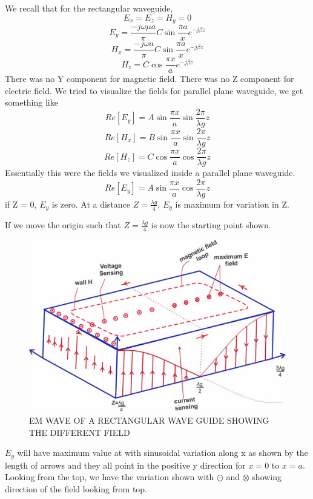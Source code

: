 We recall that for the rectangular waveguide,
\begin{equation}
E_{x} = E_{z} = H_{y} = 0
\end{equation}	
\begin{equation}
E_{y} = \dfrac{-j\omega\mu a }{\pi} C\sin \dfrac{\pi a}{x} e ^{-j\beta z}
\end{equation}
\begin{equation}
H_{x} = \dfrac{-j\omega a}{\pi} C \sin\dfrac{\pi a}{x}
	e^{-j\beta z} 
\end{equation}
\begin{equation}
H_{z} = C\cos \dfrac{\pi x}{a} e^{-j\beta z}
\end{equation}
There was no Y component for magnetic field. There was no Z component for electric field. We tried to visualize the fields for parallel plane waveguide, we get something like 
\begin{equation}
Re[E_{y}] = A\sin\dfrac{\pi x}{a} \sin\dfrac{2\pi}{\lambda g}z
\end{equation}	
\begin{equation}
Re[H_{x}] = B\sin\dfrac{\pi x}{a} \sin\dfrac{2\pi}{\lambda g}z
\end{equation}
\begin{equation}
Re[H_{z}] = C\cos\dfrac{\pi x}{a} \cos\dfrac{2\pi}{\lambda g}z
\end{equation}
Essentially this were the fields we visualized inside a
parallel plane waveguide.
\begin{equation}
Re[E_{y}] = A\sin\dfrac{\pi x}{a} \cos\dfrac{2\pi}{\lambda g}z
\end{equation}
if Z = 0, $E_{y}$ is zero. At a distance $ Z = \frac{\lambda g}{4}$, $E_{y}$ is maximum for variation in Z.

If we move the origin such that $Z = \frac{\lambda g}{4}$ is now the starting point shown.
\begin{figure}[h]
\centering
\includegraphics[width=1\linewidth]{./graphics/lecture-image-2.jpg}
\caption{EM WAVE OF A RECTANGULAR WAVE GUIDE SHOWING THE DIFFERENT FIELD}
\end{figure}
$E_{y}$ will have maximum value at   with sinusoidal variation along x as shown by the length of arrows and they all point in the positive y direction for $x = 0$ to $x = a$. Looking from the top, we have the variation shown with $\odot$ and $\otimes$ showing direction of the field looking from top.
 
